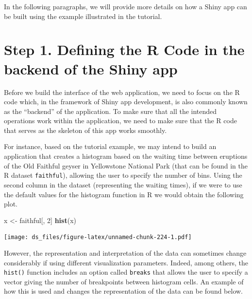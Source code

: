\documentclass[12pt,]{krantz}
\newenvironment{Shaded}{\begin{snugshade}}{\end{snugshade}}
\newcommand{\KeywordTok}[1]{\textcolor[rgb]{0.27,0.27,0.27}{\textbf{#1}}}
\newcommand{\DecValTok}[1]{\textcolor[rgb]{0.06,0.06,0.06}{#1}}
\newcommand{\StringTok}[1]{\textcolor[rgb]{0.5,0.5,0.5}{#1}}
\newcommand{\NormalTok}[1]{#1}
\begin{document}
In the following paragraphs, we will provide more details on how a Shiny
app can be built using the example illustrated in the tutorial.

\section{Step 1. Defining the R Code in the backend of the Shiny
app}\label{step-1.-defining-the-r-code-in-the-backend-of-the-shiny-app}

Before we build the interface of the web application, we need to focus
on the R code which, in the framework of Shiny app development, is also
commonly known as the ``backend'' of the application. To make sure that
all the intended operations work within the application, we need to make
sure that the R code that serves as the skeleton of this app works
smoothly.

For instance, based on the tutorial example, we may intend to build an
application that creates a histogram based on the waiting time between
eruptions of the Old Faithful geyser in Yellowstone National Park (that
can be found in the R dataset \texttt{faithful}), allowing the user to
specify the number of bins. Using the second column in the dataset
(representing the waiting times), if we were to use the default values
for the histogram function in R we would obtain the following plot.

\begin{Shaded}
\begin{Highlighting}[]
\NormalTok{x <-}\StringTok{ }\NormalTok{faithful[, }\DecValTok{2}\NormalTok{] }
\KeywordTok{hist}\NormalTok{(x)}
\end{Highlighting}
\end{Shaded}

\texttt{[image: ds\_files/figure-latex/unnamed-chunk-224-1.pdf]}

However, the representation and interpretation of the data can sometimes
change considerably if using different visualization parameters. Indeed,
among others, the \texttt{hist()} function includes an option called
\texttt{breaks} that allows the user to specify a vector giving the
number of breakpoints between histogram cells. An example of how this is
used and changes the representation of the data can be found below.
\end{document}
